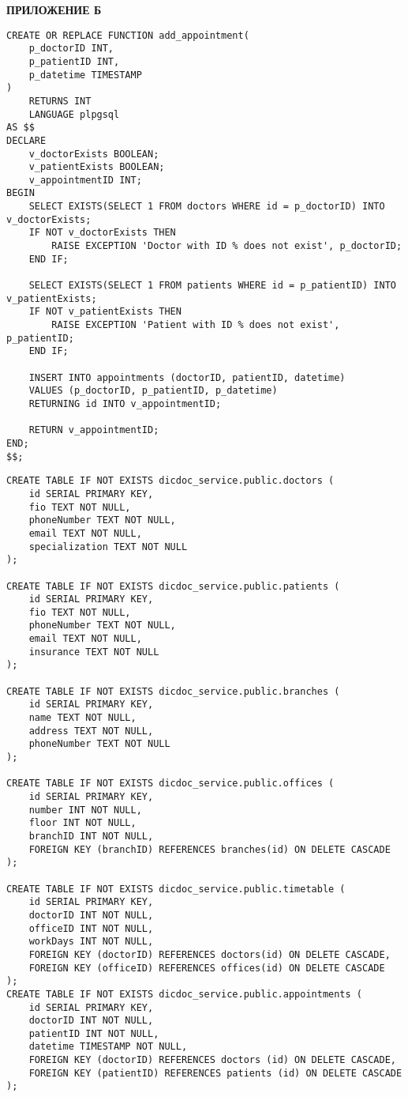 
\begin{center}
	\textbf{\large ПРИЛОЖЕНИЕ Б}
\end{center}


\begin{lstlisting}[label=lst:proc,caption=\raggedright{Создание хранимой функции}]
CREATE OR REPLACE FUNCTION add_appointment(
	p_doctorID INT,
	p_patientID INT,
	p_datetime TIMESTAMP
)
	RETURNS INT
	LANGUAGE plpgsql
AS $$
DECLARE
	v_doctorExists BOOLEAN;
	v_patientExists BOOLEAN;
	v_appointmentID INT;
BEGIN
	SELECT EXISTS(SELECT 1 FROM doctors WHERE id = p_doctorID) INTO v_doctorExists;
	IF NOT v_doctorExists THEN
		RAISE EXCEPTION 'Doctor with ID % does not exist', p_doctorID;
	END IF;
	
	SELECT EXISTS(SELECT 1 FROM patients WHERE id = p_patientID) INTO v_patientExists;
	IF NOT v_patientExists THEN
		RAISE EXCEPTION 'Patient with ID % does not exist', p_patientID;
	END IF;
	
	INSERT INTO appointments (doctorID, patientID, datetime)
	VALUES (p_doctorID, p_patientID, p_datetime)
	RETURNING id INTO v_appointmentID;
	
	RETURN v_appointmentID;
END;
$$;

\end{lstlisting}

\clearpage
\begin{lstlisting}[label=lst:init,caption=\raggedright{Создание таблиц (начало)}]
CREATE TABLE IF NOT EXISTS dicdoc_service.public.doctors (
	id SERIAL PRIMARY KEY,
	fio TEXT NOT NULL,
	phoneNumber TEXT NOT NULL,
	email TEXT NOT NULL,
	specialization TEXT NOT NULL
);
	
CREATE TABLE IF NOT EXISTS dicdoc_service.public.patients (
	id SERIAL PRIMARY KEY,
	fio TEXT NOT NULL,
	phoneNumber TEXT NOT NULL,
	email TEXT NOT NULL,
	insurance TEXT NOT NULL
);
	
CREATE TABLE IF NOT EXISTS dicdoc_service.public.branches (
	id SERIAL PRIMARY KEY,
	name TEXT NOT NULL,
	address TEXT NOT NULL,
	phoneNumber TEXT NOT NULL
);
	
CREATE TABLE IF NOT EXISTS dicdoc_service.public.offices (
	id SERIAL PRIMARY KEY,
	number INT NOT NULL,
	floor INT NOT NULL,
	branchID INT NOT NULL,
	FOREIGN KEY (branchID) REFERENCES branches(id) ON DELETE CASCADE
);

CREATE TABLE IF NOT EXISTS dicdoc_service.public.timetable (
	id SERIAL PRIMARY KEY,
	doctorID INT NOT NULL,
	officeID INT NOT NULL,
	workDays INT NOT NULL,
	FOREIGN KEY (doctorID) REFERENCES doctors(id) ON DELETE CASCADE,
	FOREIGN KEY (officeID) REFERENCES offices(id) ON DELETE CASCADE
);	
CREATE TABLE IF NOT EXISTS dicdoc_service.public.appointments (
	id SERIAL PRIMARY KEY,
	doctorID INT NOT NULL,
	patientID INT NOT NULL,
	datetime TIMESTAMP NOT NULL,
	FOREIGN KEY (doctorID) REFERENCES doctors (id) ON DELETE CASCADE,
	FOREIGN KEY (patientID) REFERENCES patients (id) ON DELETE CASCADE
);

\end{lstlisting}

